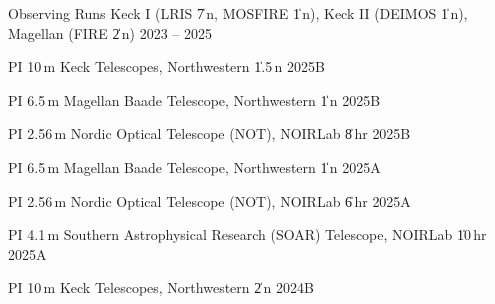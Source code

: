 


\begin{cventries}


\cvsimpentry
    {Observing Runs}
    {Keck I (LRIS \| 7\,n, MOSFIRE \| 1\,n), Keck II (DEIMOS \| 1\,n), Magellan (FIRE \| 2\,n)}
    {2023 -- 2025}
    {}

\cvsimpentry
    {PI}
    {10\,m Keck Telescopes, Northwestern \| 1.5\,n}
    {2025B}
    {}

\cvsimpentry
    {PI}
    {6.5\,m Magellan Baade Telescope, Northwestern \| 1\,n}
    {2025B}
    {}

\cvsimpentry
    {PI}
    {2.56\,m Nordic Optical Telescope (NOT), NOIRLab \| 8\,hr}
    {2025B}
    {}

\cvsimpentry
    {PI}
    {6.5\,m Magellan Baade Telescope, Northwestern \| 1\,n}
    {2025A}
    {}

\cvsimpentry
    {PI}
    {2.56\,m Nordic Optical Telescope (NOT), NOIRLab \| 6\,hr}
    {2025A}
    {}

\cvsimpentry
    {PI}
    {4.1\,m Southern Astrophysical Research (SOAR) Telescope, NOIRLab \| 10\,hr}
    {2025A}
    {}
    
\cvsimpentry
    {PI}
    {10\,m Keck Telescopes, Northwestern \| 2\,n}
    {2024B}
    {}







\end{cventries}
